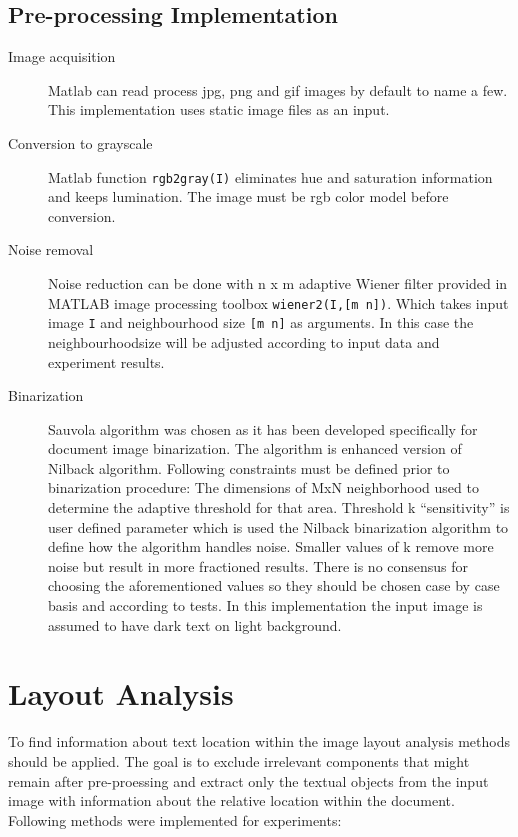 \documentclass{article}
\def\code#1{\texttt{#1}}
\begin{document}
      \subsection{Pre-processing Implementation}
        \begin{description}
          \item [Image acquisition] Matlab can read process jpg, png and gif images by default to name a few. This implementation uses static image files as an input.
          \item [Conversion to grayscale] Matlab function \code{rgb2gray(I)} eliminates hue and saturation information and keeps lumination. The image must be rgb color model before conversion.
          \item [Noise removal] Noise reduction can be done with n x m adaptive Wiener filter provided in MATLAB image processing toolbox \code{wiener2(I,[m n])}. Which takes input image \code{I} and neighbourhood size \code{[m n]} as arguments. In this case the neighbourhoodsize will be adjusted according to input data and experiment results.
          \item [Binarization] Sauvola algorithm was chosen as it has been developed specifically for document image binarization. The algorithm is enhanced version of Nilback algorithm. \cite{Sauvola2000} Following constraints must be defined prior to binarization procedure: The dimensions of MxN neighborhood used to determine the adaptive threshold for that area. Threshold k ``sensitivity'' is user defined parameter which is used the Nilback binarization algorithm to define how the algorithm handles noise. Smaller values of k remove more noise but result in more fractioned results. There is no consensus for choosing the aforementioned values so they should be chosen case by case basis and according to tests. In this implementation the input image is assumed to have dark text on light background.
        \end{description}

    \newpage
    \section{Layout Analysis}
      To find information about text location within the image layout analysis methods should be applied. The goal is to exclude irrelevant components that might remain after pre-proessing and extract only the textual objects from the input image with information about the relative location within the document. Following methods were implemented for experiments:
\end{document}
